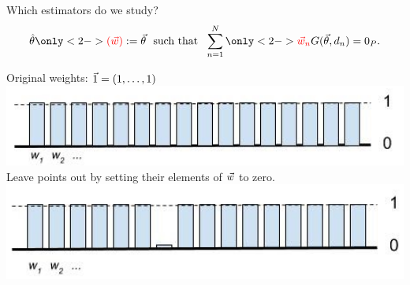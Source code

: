 
\begin{frame}[t]{Which estimators do we study?}
%
\begin{align*}
%
\thetahat \only<2->{\color{red} (\w) \color{black}} :=
\vec\theta \,\, \textrm{ such that } \,\,
\sumn
\only<2->{ \color{red} \w_{n} \color{black}}
G(\vec\theta, \d_{n}) =  \zP .
%
\end{align*}
%
\begin{minipage}{0.45\textwidth}
\begin{center}
Original weights: $\vec{1} = (1,\ldots,1)$
    \includegraphics[width=1.0\textwidth]{static_figures/orig_weights}
Leave points out by setting their elements of $\vec{w}$ to zero.
    \includegraphics[width=1.0\textwidth]{static_figures/weights_loo}
\end{center}
\end{minipage}
\begin{minipage}{0.45\textwidth}
\begin{center}
\end{center}
\end{minipage}
\end{frame}
